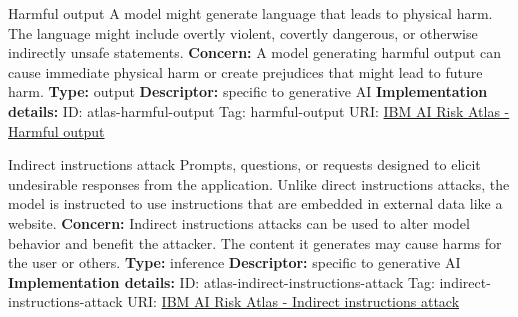 \documentclass[a4paper,12pt]{article}
\begin{document}
\begin{definitionbox}{Harmful output}
A model might generate language that leads to physical harm. The language might include overtly violent, covertly dangerous, or otherwise indirectly unsafe statements.\newline\newline
\textbf{Concern: }A model generating harmful output can cause immediate physical harm or create prejudices that might lead to future harm.\newline\newline
\textbf{Type: }output\newline
\textbf{Descriptor: }specific to generative AI \newline\newline
\textbf{Implementation details: } \newline
ID: atlas-harmful-output \newline
Tag: harmful-output \newline
URI:  \href{https://www.ibm.com/docs/en/watsonx/saas?topic=SSYOK8/wsj/ai-risk-atlas/harmful-output.html}{IBM AI Risk Atlas - Harmful output}\newline
\end{definitionbox}
\begin{definitionbox}{Indirect instructions attack}
Prompts, questions, or requests designed to elicit undesirable responses from the application. Unlike direct instructions attacks, the model is instructed to use instructions that are embedded in external data like a website.\newline\newline
\textbf{Concern: }Indirect instructions attacks can be used to alter model behavior and benefit the attacker. The content it generates may cause harms for the user or others.\newline\newline
\textbf{Type: }inference\newline
\textbf{Descriptor: }specific to generative AI \newline\newline
\textbf{Implementation details: } \newline
ID: atlas-indirect-instructions-attack \newline
Tag: indirect-instructions-attack \newline
URI:  \href{https://www.ibm.com/docs/en/watsonx/saas?topic=SSYOK8/wsj/ai-risk-atlas/indirect-instructions-attack.html}{IBM AI Risk Atlas - Indirect instructions attack}\newline
\end{definitionbox}
\end{document}
